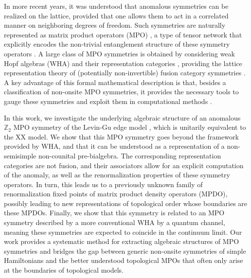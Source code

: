 \documentclass[prx, twocolumn, superscriptaddress, dvipsnames]{revtex4-2}
\theoremstyle{definition}
\begin{document}
In more recent years, it was understood that anomalous symmetries can be realized on the lattice, provided that one allows them to act in a correlated manner on neighboring degrees of freedom. Such symmetries are naturally represented as matrix product operators (MPO) \cite{verstraete2004matrix,pirvu2010matrix,haegeman2017diagonalizing}, a type of tensor network that explicitly encodes the non-trivial entanglement structure of these symmetry operators \cite{buerschaper2014twisted,csahinouglu2021characterizing,bultinck2017anyons,williamson2016matrix}. A large class of MPO symmetries is obtained by considering weak Hopf algebras (WHA) and their representation categories \cite{lootens2021matrix,molnar2022matrix}, providing the lattice representation theory of (potentially non-invertible) fusion category symmetries \cite{bridgeman2023invertible}. A key advantage of this formal mathematical description is that, besides a classification of non-onsite MPO symmetries, it provides the necessary tools to gauge these symmetries \cite{lootens2023dualities} and exploit them in computational methods \cite{lootens2025entanglement}.

In this work, we investigate the underlying algebraic structure of an anomalous $\mathbb Z_2$ MPO symmetry of the Levin-Gu edge model \cite{levin2012braiding}, which is unitarily equivalent to the XX model. We show that this MPO symmetry goes beyond the framework provided by WHA, and that it can be understood as a representation of a non-semisimple non-counital pre-bialgebra. The corresponding representation categories are not fusion, and their associators allow for an explicit computation of the anomaly, as well as the renormalization properties of these symmetry operators. In turn, this leads us to a previously unknown family of renormalization fixed points of matrix product density operators (MPDO), possibly leading to new representations of topological order whose boundaries are these MPDOs. Finally, we show that this symmetry is related to an MPO symmetry described by a more conventional WHA by a quantum channel, meaning these symmetries are expected to coincide in the continuum limit. Our work provides a systematic method for extracting algebraic structures of MPO symmetries and bridges the gap between generic non-onsite symmetries of simple Hamiltonians and the better understood topological MPOs that often only arise at the boundaries of topological models.
\end{document}
